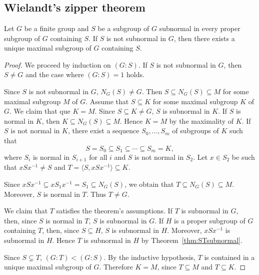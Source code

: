 \section{}

\subsection{Wielandt's zipper theorem}

\begin{theorem}[Wielandt]
	\label{thm:zipper}
	Let $G$ be a finite group and $S$ be a subgroup of $G$ subnormal in every 
    proper subgroup of $G$ containing $S$. If $S$ is not subnormal in $G$, 
    then there exists a unique maximal subgroup of $G$ containing $S$. 
\end{theorem}

\begin{proof}
	We proceed by induction on $(G:S)$. If $S$ is not subnormal in $G$, then 
	$S\ne G$ and the case where $(G:S)=1$ holds. 

	Since $S$ is not subnormal in $G$, $N_G(S)\ne G$. Then $S\subseteq
	N_G(S)\subseteq M$ for some maximal subgroup $M$ of $G$. Assume that 
	$S\subseteq K$ for some maximal subgroup $K$ of $G$. We claim that 
	que $K=M$. Since $S\subseteq K\ne G$, $S$ is subnormal in $K$. If $S$ is 
	normal in $K$, then $K\subseteq N_G(S)\subseteq M$. Hence $K=M$ by the maximality of $K$. 
	If $S$ is not normal in $K$, there exist a sequence 
	$S_0,\dots,S_m$ of subgroups of $K$ such that 
	\[
		S=S_0\subseteq S_1\subseteq\cdots\subseteq S_m=K,
	\]
    where $S_i$ is normal in $S_{i+1}$ for all $i$ and 
	$S$ is not normal in $S_2$. Let $x\in S_2$ be such that $xSx^{-1}\ne S$ and 
	$T=\langle S,xSx^{-1}\rangle\subseteq K$. 

	Since $xSx^{-1}\subseteq xS_1x^{-1}=S_1\subseteq N_G(S)$, we obtain that 
	$T\subseteq N_G(S)\subseteq M$. Moreover, $S$ is normal in $T$. Thus $T\ne G$. 

	We claim that $T$ satisfies the theorem's assumptions. If $T$ is subnormal in $G$, then, since 
	$S$ is normal in $T$, $S$ is subnormal in $G$. If $H$ is a proper subgroup of $G$ 
    containing $T$, then, since 
	$S\subseteq H$, $S$ is subnormal in $H$. Moreover, $xSx^{-1}$ is subnormal in $H$. Hence 
	$T$ is subnormal in $H$ by Theorem~\ref{thm:STsubnormal}.

	Since $S\subsetneq T$, $(G:T)<(G:S)$. By the inductive hypothesis, $T$ is contained in a unique maximal subgroup of $G$. Therefore
	$K=M$, since $T\subseteq M$ and 
	$T\subseteq K$.
\end{proof}

